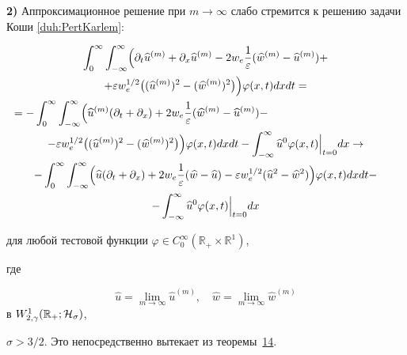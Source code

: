 \smallskip



\textbf{2)} Аппроксимационное решение при $m\to\infty$ слабо  стремится к решению задачи Коши \eqref{duh:PertKarlem}: 

\begin{multline*}

\int_0^\infty \int_{-\infty}^\infty 

\Bigl(\pa_t\widehat{u}^{(m)}+\pa_x\widehat{u}^{(m)}-2w_e\frac{1}{\ve}(\widehat{w}^{(m)}-\widehat{u}^{(m)})+

\\

+\ve w_e^{1/2}\bigl((\widehat{u}^{(m)})^2-(\widehat{w}^{(m)})^2\bigr)\Bigr) \varphi(x,t) dxdt=

\\

=-\int_0^\infty \int_{-\infty}^\infty \Bigl(\widehat{u}^{(m)} (\pa_t+\pa_x)+2w_e\frac{1}{\ve}(\widehat{w}^{(m)}-\widehat{u}^{(m)})- \hspace{4cm} \;

\\

-\ve w_e^{1/2}\bigl((\widehat{u}^{(m)})^2-(\widehat{w}^{(m)})^2\bigr)\Bigr) \varphi(x,t) dxdt

-\int_{-\infty}^\infty \widehat{u}^0 \varphi(x,t)\Bigr|_{t=0} dx\to

\\


-\int_0^\infty \int_{-\infty}^\infty \Bigl(\widehat{u} (\pa_t+\pa_x)+2w_e\frac{1}{\ve}(\widehat{w}-\widehat{u})-\ve w_e^{1/2}(\widehat{u}^2-\widehat{w}^2)\Bigr) \varphi(x,t) dxdt-

\\

-\int_{-\infty}^\infty \widehat{u}^0 \varphi(x,t)\Bigr|_{t=0} dx

\end{multline*}

для любой тестовой функции $\varphi\in C_0^\infty(\mathbb R_{+}\times \mathbb R^1)$,

где 

$$\widehat{u}=\lim\limits_{m \to \infty}  \widehat{u}^{(m)},\quad \widehat{w}=\lim\limits_{m \to \infty}  \widehat{w}^{(m)}$$ в $W^1_{2,\gamma}(\mathbb R_{+}; {\cal H}_\sigma)$,

$\sigma>3/2$. Это непосредственно вытекает из теоремы~\hyperlink{dukh:th14}{14}. 


